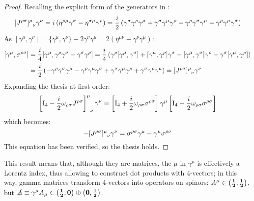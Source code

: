 \begin{proofbox}
  \begin{proof}
    Recalling the explicit form of the generators in :
    \begin{equation*}
      \tensor{[J^{\rho \sigma}]}{^\mu_\nu} \gamma^\nu = i \left( \eta^{\rho \mu} \gamma^\sigma - \eta^{\sigma \mu} \gamma^\rho \right) = \frac{i}{2} \left( \gamma^\sigma \gamma^\rho \gamma^\mu + \gamma^\sigma \gamma^\mu \gamma^\rho - \gamma^\rho \gamma^\sigma \gamma^\mu - \gamma^\rho \gamma^\mu \gamma^\sigma \right)
    \end{equation*}
    As $ [\gamma^\mu , \gamma^\nu] = \{\gamma^\mu , \gamma^\nu\} - 2 \gamma^\nu \gamma^\mu = 2 \left( \eta^{\mu \nu} - \gamma^\nu \gamma^\mu \right) $:
    \begin{equation*}
      \begin{split}
        [\gamma^\mu , \sigma^{\rho \sigma}]
        &= \frac{i}{4} [\gamma^\mu , \gamma^\rho \gamma^\sigma - \gamma^\sigma \gamma^\rho] = \frac{i}{4} \left( \gamma^\rho [\gamma^\mu , \gamma^\sigma] + [\gamma^\mu , \gamma^\rho] \gamma^\sigma - [\gamma^\mu , \gamma^\sigma] \gamma^\rho - \gamma^\sigma [\gamma^\mu , \gamma^\rho] \right) \\
        &= \frac{i}{2} \left( - \gamma^\rho \gamma^\sigma \gamma^\mu - \gamma^\rho \gamma^\mu \gamma^\sigma + \gamma^\sigma \gamma^\mu \gamma^\rho + \gamma^\sigma \gamma^\rho \gamma^\mu \right) = \tensor{[J^{\rho \sigma}]}{^\mu_\nu} \gamma^\nu
      \end{split}
    \end{equation*}
    Expanding the thesis at first order:
    \begin{equation*}
      \tensor{\left[ \tens{I}_4 - \frac{i}{2} \omega_{\rho \sigma} J^{\rho \sigma} \right]}{^\mu_\nu} \gamma^\nu = \left[ \tens{I}_4 + \frac{i}{2} \omega_{\rho \sigma} \sigma^{\rho \sigma} \right] \gamma^\mu \left[ \tens{I}_4 - \frac{i}{2} \omega_{\rho \sigma} \sigma^{\rho \sigma} \right]
    \end{equation*}
    which becomes:
    \begin{equation*}
      - \tensor{[J^{\rho \sigma}]}{^\mu_\nu} \gamma^\nu = \sigma^{\rho \sigma} \gamma^\mu - \gamma^\mu \sigma^{\rho \sigma}
    \end{equation*}
    This equation has been verified, so the thesis holds.
  \end{proof}
\end{proofbox}

This result means that, although they are matrices, the $ \mu $ in $ \gamma^\mu $ is effectively a Lorentz index, thus allowing to construct dot products with 4-vectors; in this way, gamma matrices transform 4-vectors into operators on spinors\footnotemark: $ A^\mu \in \mathbf{\left( \frac{1}{2},\frac{1}{2} \right)} $, but $ \slashed{A} \equiv \gamma^\mu A_\mu \in \mathbf{\left( \frac{1}{2},0 \right)} \oplus \mathbf{\left( 0,\frac{1}{2} \right)} $.
%

